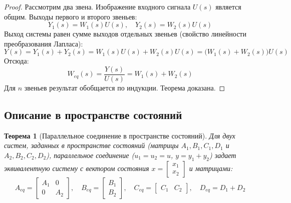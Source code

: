 \documentclass[12pt,a4paper]{article}
\newtheorem{theorem}{Теорема}
\begin{document}
\begin{proof}
    Рассмотрим два звена. Изображение входного сигнала $U(s)$ является общим.
    Выходы первого и второго звеньев:
    \begin{equation}
        Y_1(s) = W_1(s)U(s), \quad Y_2(s) = W_2(s)U(s)
    \end{equation}
    Выход системы равен сумме выходов отдельных звеньев (свойство линейности преобразования Лапласа):
    \begin{equation}
        Y(s) = Y_1(s) + Y_2(s) = W_1(s)U(s) + W_2(s)U(s) = \big(W_1(s) + W_2(s)\big)U(s)
    \end{equation}
    Отсюда:
    \begin{equation}
        W_{eq}(s) = \frac{Y(s)}{U(s)} = W_1(s) + W_2(s)
    \end{equation}
    Для $n$ звеньев результат обобщается по индукции. Теорема доказана.
\end{proof}

\subsection{Описание в пространстве состояний}

\begin{theorem}[Параллельное соединение в пространстве состояний]
    Для двух систем, заданных в пространстве состояний (матрицы $A_1, B_1, C_1, D_1$ и $A_2, B_2, C_2, D_2$), параллельное соединение ($u_1 = u_2 = u$, $y = y_1 + y_2$) задает эквивалентную систему с вектором состояния $x = \begin{bmatrix} x_1 \\ x_2 \end{bmatrix}$ и матрицами:
    \begin{equation}
        A_{eq} = \begin{bmatrix} A_1 & 0 \\ 0 & A_2 \end{bmatrix}, \quad
        B_{eq} = \begin{bmatrix} B_1 \\ B_2 \end{bmatrix}, \quad
        C_{eq} = \begin{bmatrix} C_1 & C_2 \end{bmatrix}, \quad
        D_{eq} = D_1 + D_2
    \end{equation}
\end{theorem}
\end{document}
